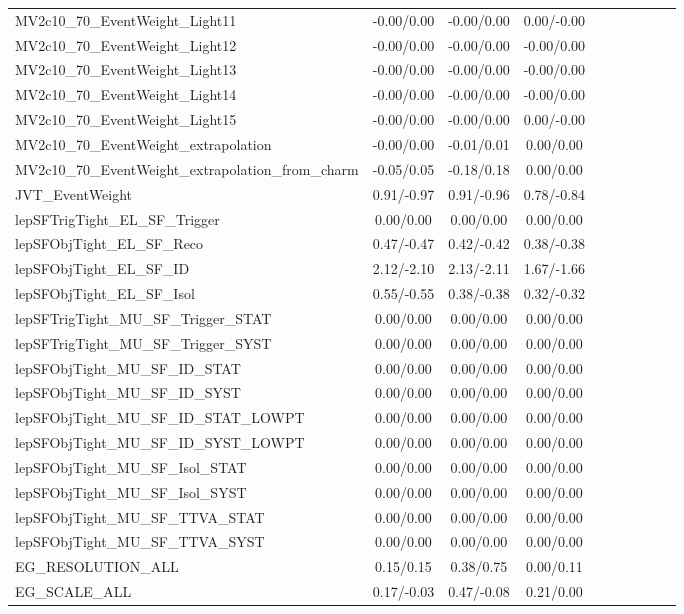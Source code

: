 \begin{table}[h]
\begin{center}
\begin{tabular}{l|ccccccccc}
MV2c10\_70\_EventWeight\_Light11 &-0.00/0.00 &-0.00/0.00 &0.00/-0.00 \\
MV2c10\_70\_EventWeight\_Light12 &-0.00/0.00 &-0.00/0.00 &-0.00/0.00 \\
MV2c10\_70\_EventWeight\_Light13 &-0.00/0.00 &-0.00/0.00 &-0.00/0.00 \\
MV2c10\_70\_EventWeight\_Light14 &-0.00/0.00 &-0.00/0.00 &-0.00/0.00 \\
MV2c10\_70\_EventWeight\_Light15 &-0.00/0.00 &-0.00/0.00 &0.00/-0.00 \\
MV2c10\_70\_EventWeight\_extrapolation &-0.00/0.00 &-0.01/0.01 &0.00/0.00 \\
MV2c10\_70\_EventWeight\_extrapolation\_from\_charm &-0.05/0.05 &-0.18/0.18 &0.00/0.00 \\
JVT\_EventWeight &0.91/-0.97 &0.91/-0.96 &0.78/-0.84 \\
lepSFTrigTight\_EL\_SF\_Trigger &0.00/0.00 &0.00/0.00 &0.00/0.00 \\
lepSFObjTight\_EL\_SF\_Reco &0.47/-0.47 &0.42/-0.42 &0.38/-0.38 \\
lepSFObjTight\_EL\_SF\_ID &2.12/-2.10 &2.13/-2.11 &1.67/-1.66 \\
lepSFObjTight\_EL\_SF\_Isol &0.55/-0.55 &0.38/-0.38 &0.32/-0.32 \\
lepSFTrigTight\_MU\_SF\_Trigger\_STAT &0.00/0.00 &0.00/0.00 &0.00/0.00 \\
lepSFTrigTight\_MU\_SF\_Trigger\_SYST &0.00/0.00 &0.00/0.00 &0.00/0.00 \\
lepSFObjTight\_MU\_SF\_ID\_STAT &0.00/0.00 &0.00/0.00 &0.00/0.00 \\
lepSFObjTight\_MU\_SF\_ID\_SYST &0.00/0.00 &0.00/0.00 &0.00/0.00 \\
lepSFObjTight\_MU\_SF\_ID\_STAT\_LOWPT &0.00/0.00 &0.00/0.00 &0.00/0.00 \\
lepSFObjTight\_MU\_SF\_ID\_SYST\_LOWPT &0.00/0.00 &0.00/0.00 &0.00/0.00 \\
lepSFObjTight\_MU\_SF\_Isol\_STAT &0.00/0.00 &0.00/0.00 &0.00/0.00 \\
lepSFObjTight\_MU\_SF\_Isol\_SYST &0.00/0.00 &0.00/0.00 &0.00/0.00 \\
lepSFObjTight\_MU\_SF\_TTVA\_STAT &0.00/0.00 &0.00/0.00 &0.00/0.00 \\
lepSFObjTight\_MU\_SF\_TTVA\_SYST &0.00/0.00 &0.00/0.00 &0.00/0.00 \\
EG\_RESOLUTION\_ALL &0.15/0.15 &0.38/0.75 &0.00/0.11 \\
EG\_SCALE\_ALL &0.17/-0.03 &0.47/-0.08 &0.21/0.00 \\

\end{tabular}
\end{center}
\end{table}

